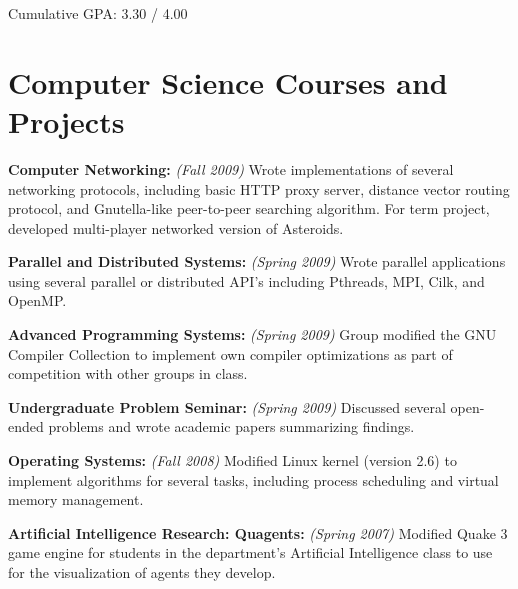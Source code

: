 \documentclass[letterpaper]{resume}
\begin{document}
\begin{compactitem}
	\item Cumulative GPA: 3.30 / 4.00 \par
\end{compactitem}

\section{Computer Science Courses and Projects}
\vspace{\secskip}

\begin{compactitem}
	\item \textbf{Computer Networking:} \textit{(Fall 2009)} Wrote implementations of several networking protocols, including basic HTTP proxy server, distance vector routing protocol, and Gnutella-like peer-to-peer searching algorithm. For term project, developed multi-player networked version of Asteroids. \par
	
	\item \textbf{Parallel and Distributed Systems:} \textit{(Spring 2009)} Wrote parallel applications using several parallel or distributed API's including Pthreads, MPI, Cilk, and OpenMP. \par

	\item \textbf{Advanced Programming Systems:} \textit{(Spring 2009)} Group modified the GNU Compiler Collection to implement own compiler optimizations as part of competition with other groups in class. \par

	\item \textbf{Undergraduate Problem Seminar:} \textit{(Spring 2009)} Discussed several open-ended problems and wrote academic papers summarizing findings. \par
	
	\item \textbf{Operating Systems:} \textit{(Fall 2008)} Modified Linux kernel (version 2.6) to implement algorithms for several tasks, including process scheduling and virtual memory management. \par
	
	\item \textbf{Artificial Intelligence Research: Quagents:} \textit{(Spring 2007)} Modified Quake 3 game engine for students in the department's Artificial Intelligence class to use for the visualization of agents they develop. \par
\end{compactitem}
\end{document}
